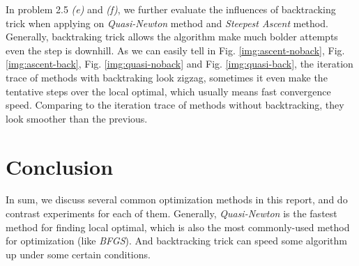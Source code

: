 In problem 2.5 \textit{(e)} and \textit{(f)}, we further evaluate the influences of backtracking trick when applying on \textit{Quasi-Newton} method and \textit{Steepest Ascent} method. Generally, backtraking trick allows the algorithm make much bolder attempts even the step is downhill. As we can easily tell in Fig. \ref{img:ascent-noback}, Fig. \ref{img:ascent-back}, Fig. \ref{img:quasi-noback} and Fig. \ref{img:quasi-back}, the iteration trace of methods with backtraking look zigzag, sometimes it even make the tentative steps over the local optimal, which usually means fast convergence speed. Comparing to the iteration trace of methods without backtracking, they look smoother than the previous. 

\section{Conclusion}

In sum, we discuss several common optimization methods in this report, and do contrast experiments for each of them. Generally, \textit{Quasi-Newton} is the fastest method for finding local optimal, which is also the most commonly-used method for optimization (like \textit{BFGS}). And backtracking trick can speed some algorithm up under some certain conditions. 

